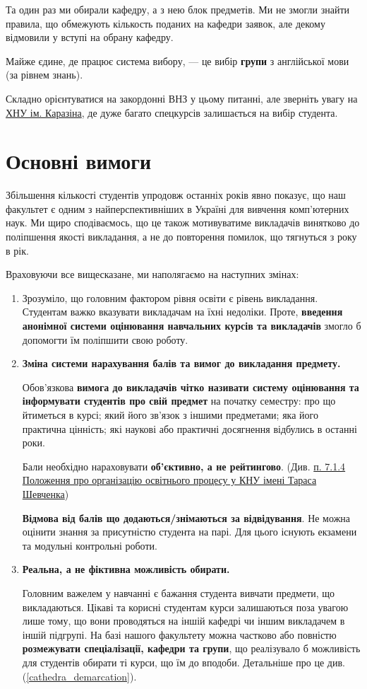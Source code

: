 \documentclass[14pt, a4paper]{extarticle}  %
\begin{document}
Та один раз ми обирали кафедру, а з нею блок предметів. Ми не змогли знайти правила, що обмежують кількость поданих на кафедри заявок, але декому відмовили у вступі на обрану кафедру. 

Майже єдине, де працює система вибору, --- це вибір \textbf{групи} з англійської мови (за рівнем знань). 

Складно орієнтуватися на закордонні ВНЗ у цьому питанні, але зверніть увагу на \href{http://appmath.univer.kharkov.ua/courses_new.html}{ХНУ ім. Каразіна}, де дуже багато спецкурсів залишається на вибір студента. 
\newpage

\section{Основні вимоги}
Збільшення кількості студентів упродовж останніх років явно показує, що наш факультет є одним з найперспективніших в Україні для вивчення комп'ютерних наук. Ми щиро сподіваємось, що це також мотивуватиме викладачів винятково до поліпшення якості викладання, а не до повторення помилок, що тягнуться з року в рік. 

Враховуючи все вищесказане, ми наполягаємо на наступних змінах:
\begin{enumerate}
    \item  
    Зрозуміло, що головним фактором рівня освіти є рівень викладання. Студентам важко вказувати викладачам на їхні недоліки. Проте, \textbf{ введення анонімної системи оцінювання навчальних курсів та викладачів} змогло б допомогти їм поліпшити свою роботу. 
    
    \item  \textbf{Зміна системи нарахування балів та вимог до викладання предмету.}
    
    Обов'язкова \textbf{вимога до викладачів чітко називати систему оцінювання та інформувати студентів про свій предмет} на початку семестру: про що йтиметься в курсі; який його зв'язок з іншими предметами; яка його практична цінність; які наукові або практичні досягнення відбулись в останні роки.
    
    Бали необхідно нараховувати \textbf{об'єктивно, а не рейтингово}. (Див. \href{http://nmc.univ.kiev.ua/docs/Poloz_org_osv_proc-2018.pdf}{п. 7.1.4 Положення про організацію освітнього процесу у КНУ імені Тараса Шевченка})
    
    \textbf{Відмова від балів що додаються/знімаються за відвідування}. Не можна оцінити знання за присутністю студента на парі. Для цього існують екзамени та модульні контрольні роботи.
    
    \item \textbf{Реальна, а не фіктивна можливість обирати.} 
    
    Головним важелем у навчанні є бажання студента вивчати предмети, що викладаються. Цікаві та корисні студентам курси залишаються поза увагою лише тому, що вони проводяться на іншій кафедрі чи іншим викладачем в іншій підгрупі. На базі нашого факультету можна частково або повністю \textbf{розмежувати спеціалізації, кафедри та групи}, що реалізувало б можливість для студентів обирати ті курси, що їм до вподоби. Детальніше про це див. (\ref{cathedra_demarcation}). 
\end{enumerate}
\end{document}

